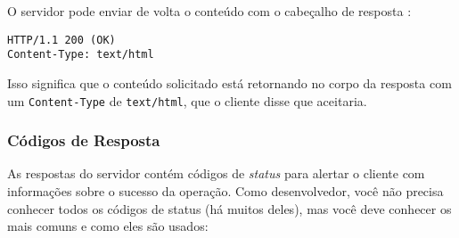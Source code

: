 \documentclass[12pt, a4paper
]{article}
\begin{document}
O servidor pode enviar de volta o conteúdo com o cabeçalho de resposta :

\begin{verbatim}
HTTP/1.1 200 (OK)
Content-Type: text/html
\end{verbatim}

Isso significa que o conteúdo solicitado está retornando no corpo da
resposta com um \texttt{Content-Type} de \texttt{text/html}, que o
cliente disse que aceitaria.

\hypertarget{cuxf3digos-de-resposta}{%
\subsubsection{Códigos de Resposta}\label{cuxf3digos-de-resposta}}

As respostas do servidor contém códigos de \emph{status} para alertar o
cliente com informações sobre o sucesso da operação. Como desenvolvedor,
você não precisa conhecer todos os códigos de status (há muitos deles),
mas você deve conhecer os mais comuns e como eles são usados:
\end{document}
